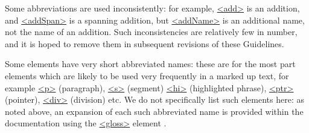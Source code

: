 Some abbreviations are used inconsistently: for example, \hyperref[TEI.add]{<add>} is an addition, and \hyperref[TEI.addSpan]{<addSpan>} is a spanning addition, but \hyperref[TEI.addName]{<addName>} is an additional name, not the name of an addition. Such inconsistencies are relatively few in number, and it is hoped to remove them in subsequent revisions of these Guidelines.\par
Some elements have very short abbreviated names: these are for the most part elements which are likely to be used very frequently in a marked up text, for example \hyperref[TEI.p]{<p>} (paragraph), \hyperref[TEI.s]{<s>} (segment) \hyperref[TEI.hi]{<hi>} (highlighted phrase), \hyperref[TEI.ptr]{<ptr>} (pointer), \hyperref[TEI.div]{<div>} (division) etc. We do not specifically list such elements here: as noted above, an expansion of each such abbreviated name is provided within the documentation using the \hyperref[TEI.gloss]{<gloss>} element .
